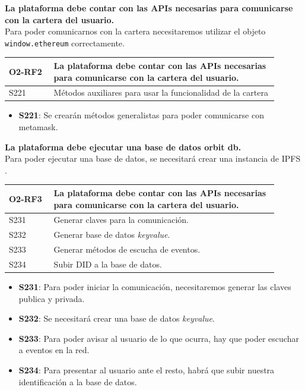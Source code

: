 \textbf{La plataforma debe contar con las APIs necesarias para comunicarse con la cartera del usuario.}\\
Para poder comunicarnos con la cartera necesitaremos utilizar el objeto \verb|window.ethereum| correctamente.
\begin{center}
    \begin{table}[h!]
        \begin{tabular}{|p{0.15\linewidth} | p{0.75\linewidth}|}
            \hline
            \rowcolor{Gray} 
            \textbf{O2-RF2} & \textbf{La plataforma debe contar con las APIs necesarias para comunicarse con la cartera del usuario.} \\
            \hline
            S221     & Métodos auxiliares para usar la funcionalidad de la cartera \\
            \hline
        \end{tabular}
    \end{table}
\end{center}
\begin{itemize}
    \item \textbf{S221}: Se crearán métodos generalistas para poder comunicarse con metamask.
\end{itemize}
\textbf{La plataforma debe ejecutar una base de datos orbit db.}\\
Para poder ejecutar una base de datos, se necesitará crear una instancia de IPFS \cite{web:ipfs}.
\begin{center}
    \begin{table}[h!]
        \begin{tabular}{|p{0.15\linewidth} | p{0.75\linewidth}|}
            \hline
            \rowcolor{Gray} 
            \textbf{O2-RF3} & \textbf{La plataforma debe contar con las APIs necesarias para comunicarse con la cartera del usuario.} \\
            \hline
            S231     & Generar claves para la comunicación. \\
            \hline
            S232     & Generar base de datos \textit{keyvalue}. \\
            \hline
            S233     & Generar métodos de escucha de eventos. \\
            \hline
            S234     & Subir DID a la base de datos. \\
            \hline
        \end{tabular}
    \end{table}
\end{center}
\begin{itemize}
    \item \textbf{S231}: Para poder iniciar la comunicación, necesitaremos generar las claves publica y privada.
    \item \textbf{S232}: Se necesitará crear una base de datos \textit{keyvalue}.
    \item \textbf{S233}: Para poder avisar al usuario de lo que ocurra, hay que poder escuchar a eventos en la red.
    \item \textbf{S234}: Para presentar al usuario ante el resto, habrá que subir nuestra identificación a la base de datos.
\end{itemize}
